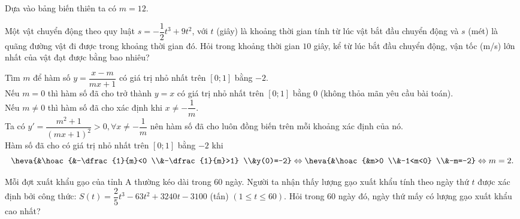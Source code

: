 \begin{ex}
\begin{ex}
{\begin{center}
 \end{center}
 Dựa vào bảng biến thiên ta có $m=12$.
 }
\end{ex}
\begin{ex}%
 Một vật chuyển động theo quy luật $s=-\dfrac12t^3+9t^2$, với $t$ (giây) là khoảng thời gian tính từ lúc vật bắt đầu chuyển động và $s$ (mét) là quãng đường vật đi được trong khoảng thời gian đó. Hỏi trong khoảng thời gian $10$ giây, kể từ lúc bắt đầu chuyển động, vận tốc (m/s) lớn nhất của vật đạt được bằng bao nhiêu?\\
\end{ex}
\begin{ex}%
 Tìm $m$ để hàm số $y=\dfrac{x-m}{mx+1}$ có giá trị nhỏ nhất trên $[0;1]$ bằng $-2$.\\
 \loigiai
 {
 Nếu $m=0$ thì hàm số đã cho trở thành $y=x$ có giá trị nhỏ nhất trên $[0;1]$ bằng $0$ (không thỏa mãn yêu cầu bài toán).\\
 Nếu $m \neq 0$ thì hàm số đã cho xác định khi $x\neq -\dfrac{1}{m}$.\\
 Ta có $y'=\dfrac{m^2+1}{(mx+1)^2}>0, \forall x \neq -\dfrac{1}{m}$ nên hàm số đã cho luôn đồng biến trên mỗi khoảng xác định của nó.\\
 Hàm số đã cho có giá trị nhỏ nhất trên $[0;1]$ bằng $-2$ khi
 \[\heva{&\hoac{&-\dfrac{1}{m}<0 \\&-\dfrac{1}{m}>1} \\&y(0)=-2} \Leftrightarrow \heva{&\hoac{&m>0 \\&-1<m<0} \\&-m=-2} \Leftrightarrow m=2.\]
 }
\end{ex}
\begin{ex}%
 Mỗi đợt xuất khẩu gạo của tỉnh A thường kéo dài trong $60$ ngày. Người ta nhận thấy lượng gạo xuất khẩu tính theo ngày thứ $t$ được xác định bởi công thức: $S(t)=\dfrac{2}{5}t^3-63t^2+3240t-3100$ (tấn) $(1 \le t \le 60)$. Hỏi trong $60$ ngày đó, ngày thứ mấy có lượng gạo xuất khẩu cao nhất?\\

\end{ex}
\end{ex}
